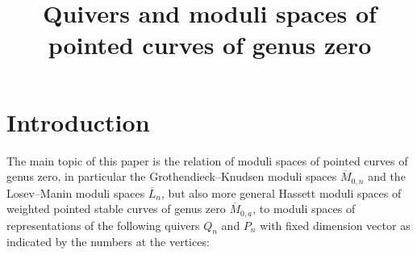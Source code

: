\documentclass[ALCO,ThmDefs,Unicode,epreuves]{cedram}
\author{\firstname{Mark} \lastname{Blume}}
\author{\firstname{Lutz} \lastname{Hille}}
\title{Quivers and moduli spaces of pointed curves of genus zero}
\begin{document}
\maketitle


\section*{Introduction}

The main topic of this paper is the relation of moduli spaces of pointed curves 
of genus zero, in particular the Grothendieck--Knudsen moduli spaces
$\overline{M}_{0,n}$ and the Losev--Manin moduli spaces $\overline{L}_n$,
but also more general Hassett moduli spaces of weighted pointed
stable curves of genus zero $\overline{M}_{0,a}$,
to moduli spaces of representations of the following quivers 
$Q_n$ and $P_n$ with fixed dimension vector as indicated by the numbers
at the vertices:




\end{document}
